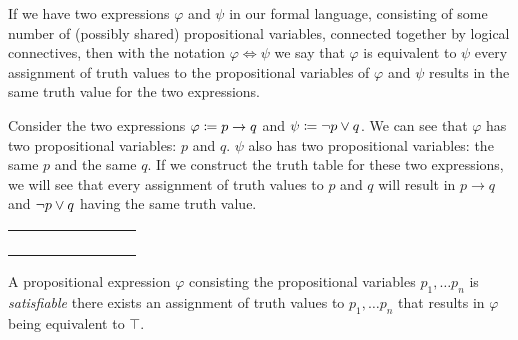 \begin{definition}[Equivalence]
    If we have two expressions \(\varphi\) and \(\psi\) in our formal language,
    consisting of some number of (possibly shared) propositional variables, connected together by logical connectives,
    then with the notation \(\varphi \iff \psi\) we say that \(\varphi\) is equivalent to \(\psi\)
    \iffbydefn every assignment of truth values to the propositional variables of \(\varphi\) and \(\psi\) results
    in the same truth value for the two expressions.
\end{definition}
\begin{example}
    Consider the two expressions \(\varphi \coloneqq p \rightarrow q\) and \(\psi \coloneqq \neg p \vee q\).
    We can see that \(\varphi\) has two propositional variables: \(p\) and \(q\).
    \(\psi\) also has two propositional variables: the same \(p\) and the same \(q\).
    If we construct the truth table for these two expressions,
    we will see that every assignment of truth values to \(p\) and \(q\) will result in \(p \rightarrow q\) and \(\neg p \vee q\)
    having the same truth value.

    \begin{table}[H]
        \centering
        \begin{tabular}{|CcCc||CcCc|} \hline
             &  &  & \\ \hline
            \thead{\(\top\)} & \thead{\(\top\)} &  & \\
            \thead{\(\top\)} & \thead{\(\bot\)} &  & \\
            \thead{\(\bot\)} & \thead{\(\top\)} &  &  \\
            \thead{\(\bot\)} & \thead{\(\bot\)} &  &  \\ \hline
        \end{tabular}
    \end{table}
\end{example}
\begin{definition}[Satisfiability]
    A propositional expression \(\varphi\) consisting the propositional variables \(p_1, \dots p_n\) is \emph{satisfiable}
    \iffbydefn there exists an assignment of truth values to \(p_1, \dots p_n\) that results in \(\varphi\) being equivalent to \(\top\).
\end{definition}

